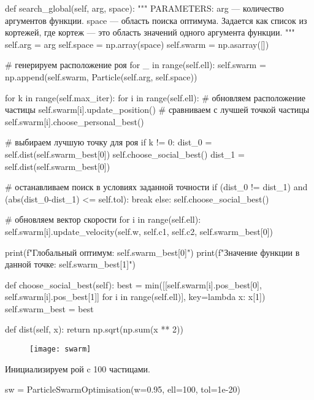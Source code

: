 \newpage
\begin{pyprint}
  def search_global(self, arg, space):
    """
    PARAMETERS:
    arg --- количество аргументов функции.
    space --- область поиска оптимума. Задается как список из
    кортежей, где кортеж --- это область значений
    одного аргумента функции.
    """
    self.arg = arg
    self.space = np.array(space)
    self.swarm = np.asarray([])

    # генерируем расположение роя
    for _ in range(self.ell):
       self.swarm = np.append(self.swarm,
                              Particle(self.arg, self.space))

    for k in range(self.max_iter):
       for i in range(self.ell):
          # обновляем расположение частицы
          self.swarm[i].update_position()
          # сравниваем с лучшей точкой частицы
          self.swarm[i].choose_personal_best()

       # выбираем лучшую точку для роя
       if k != 0:
          dist_0 = self.dist(self.swarm_best[0])
          self.choose_social_best()
          dist_1 = self.dist(self.swarm_best[0])

          # останавливаем поиск в условиях заданной точности
          if (dist_0 != dist_1) and (abs(dist_0-dist_1) <= self.tol):
             break
       else:
          self.choose_social_best()

       # обновляем вектор скорости
       for i in range(self.ell):
          self.swarm[i].update_velocity(self.w, self.c1,
                                        self.c2, self.swarm_best[0])

       print(f"Глобальный оптимум: {self.swarm_best[0]}")
       print(f"Значение функции в данной точке: {self.swarm_best[1]}")
\end{pyprint}

\begin{pyprint}
  def choose_social_best(self):
    best = min([[self.swarm[i].pos_best[0],
                 self.swarm[i].pos_best[1]] for i in range(self.ell)],
                 key=lambda x: x[1])
    self.swarm_best = best

  def dist(self, x):
    return np.sqrt(np.sum(x ** 2))
\end{pyprint}

\begin{figure}[h!]
\centering
\texttt{[image: swarm]}
\caption{}
\label{img:swarm}
\end{figure}

Инициализируем рой c 100 частицами.
\begin{pyin}
sw = ParticleSwarmOptimisation(w=0.95, ell=100, tol=1e-20)
\end{pyin}

